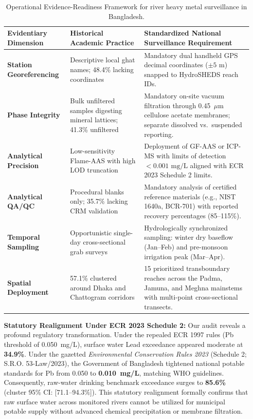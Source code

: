 \documentclass[authoryear,preprint,12pt]{elsarticle}
\begin{document}
\begin{table}[htbp]
\centering
\small
\caption{Operational Evidence-Readiness Framework for river heavy metal surveillance in Bangladesh.}
\label{tab:blueprint}
\begin{tabularx}{\textwidth}{lXX}
\toprule
Evidentiary Dimension & Historical Academic Practice & Standardized National Surveillance Requirement \\
\midrule
\textbf{Station Georeferencing} & Descriptive local ghat names; 48.4\% lacking coordinates & Mandatory dual handheld GPS decimal coordinates ($\pm 5\text{ m}$) snapped to HydroSHEDS reach IDs. \\
\textbf{Phase Integrity} & Bulk unfiltered samples digesting mineral lattices; 41.3\% unfiltered & Mandatory on-site vacuum filtration through 0.45~$\mu\text{m}$ cellulose acetate membranes; separate dissolved vs.\ suspended reporting. \\
\textbf{Analytical Precision} & Low-sensitivity Flame-AAS with high LOD truncation & Deployment of GF-AAS or ICP-MS with limits of detection $<0.001\text{ mg/L}$ aligned with ECR 2023 Schedule 2 limits. \\
\textbf{Analytical QA/QC} & Procedural blanks only; 35.7\% lacking CRM validation & Mandatory analysis of certified reference materials (e.g., NIST 1640a, BCR-701) with reported recovery percentages (85--115\%). \\
\textbf{Temporal Sampling} & Opportunistic single-day cross-sectional grab surveys & Hydrologically synchronized sampling: winter dry baseflow (Jan--Feb) and pre-monsoon irrigation peak (Mar--Apr). \\
\textbf{Spatial Deployment} & 57.1\% clustered around Dhaka and Chattogram corridors & 15 prioritized transboundary reaches across the Padma, Jamuna, and Meghna mainstems with multi-point cross-sectional transects. \\
\bottomrule
\end{tabularx}
\end{table}

\textbf{Statutory Realignment Under ECR 2023 Schedule 2:}
Our audit reveals a profound regulatory transformation. Under the repealed ECR 1997 rules (Pb threshold of 0.050~mg/L), surface water Lead exceedance appeared moderate at \textbf{34.9\%}. Under the gazetted \textit{Environmental Conservation Rules 2023} (Schedule 2; S.R.O. 53-Law/2023), the Government of Bangladesh tightened national potable standards for Pb from 0.050 to \textbf{0.010~mg/L}, matching WHO guidelines. Consequently, raw-water drinking benchmark exceedance surges to \textbf{85.6\%} (cluster 95\% CI: [71.1--94.3\%]). This statutory realignment formally confirms that raw surface water across monitored rivers cannot be utilized for municipal potable supply without advanced chemical precipitation or membrane filtration.
\end{document}

